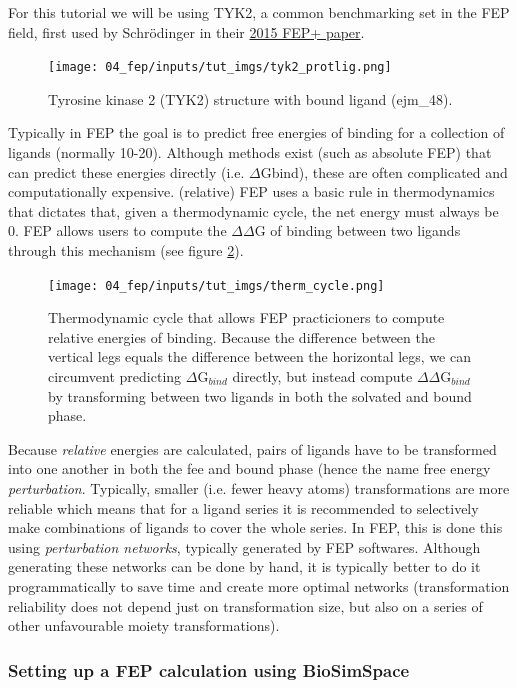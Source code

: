 For this tutorial we will be using TYK2, a common benchmarking set in
the FEP field, first used by Schrödinger in their
\href{https://pubs.acs.org/doi/abs/10.1021/ja512751q}{2015 FEP+ paper}.

\begin{figure}[htp]
\texttt{[image: 04\_fep/inputs/tut\_imgs/tyk2\_protlig.png]}
\caption{Tyrosine kinase 2 (TYK2) structure with bound ligand
(ejm\_48).}
\label{tyk2_bound_fig}
\end{figure}


Typically in FEP the goal is to predict free energies of binding for a
collection of ligands (normally 10-20). Although methods exist (such as
absolute FEP) that can predict these energies directly (i.e. $\Delta$Gbind),
these are often complicated and computationally expensive. (relative)
FEP uses a basic rule in thermodynamics that dictates that, given a
thermodynamic cycle, the net energy must always be 0. FEP allows users
to compute the $\Delta\Delta$G of binding between two ligands through this mechanism
(see figure \ref{thermodynamic_cycle_fig}).

\begin{figure}[htp]
\texttt{[image: 04\_fep/inputs/tut\_imgs/therm\_cycle.png]}
\caption{Thermodynamic cycle that allows FEP practicioners to
compute relative energies of binding. Because the difference between the
vertical legs equals the difference between the horizontal legs, we can
circumvent predicting $\Delta$G$_{bind}$ directly, but instead compute $\Delta\Delta$G$_{bind}$ by
transforming between two ligands in both the solvated and bound phase.}
\label{thermodynamic_cycle_fig}
\end{figure}

Because \emph{relative} energies are calculated, pairs of ligands have to be transformed into one another in both the fee and bound phase (hence the name free energy \emph{perturbation}. Typically, smaller (i.e. fewer heavy atoms) transformations are more reliable which means
that for a ligand series it is recommended to selectively make combinations of
ligands to cover the whole series. In FEP, this is done this using
\emph{perturbation networks}, typically generated by FEP softwares.
Although generating these networks can be done by hand, it is typically
better to do it programmatically to save time and create more optimal networks
(transformation reliability does not depend just on transformation size,
but also on a series of other unfavourable moiety transformations).

\subsubsection{Setting up a FEP calculation using BioSimSpace}

